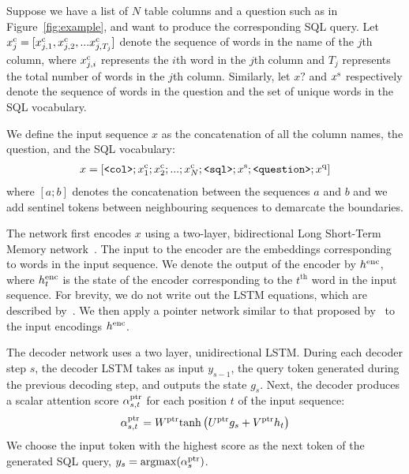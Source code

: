\documentclass{article} %
\begin{document}
Suppose we have a list of $N$ table columns and a question such as in Figure~\ref{fig:example}, and want to produce the corresponding SQL query.
Let $x_j^{\rm c} = [x^{\rm c}_{j, 1}, x^{\rm c}_{j, 2}, ... x^{\rm c}_{j, T_j}]$ denote the sequence of words in the name of the $j$th column, where $x^{\rm c}_{j, i}$ represents the $i$th word in the $j$th column and $T_j$ represents the total number of words in the $j$th column.
Similarly, let $x\question$ and $x^{\rm s}$ respectively denote the sequence of words in the question and the set of unique words in the SQL vocabulary.

We define the input sequence $x$ as the concatenation of all the column names, the question, and the SQL vocabulary:
\begin{align}
x = \left[ \texttt{<col>} ; x_1^{\rm c} ; x_2^{\rm c} ; ... ; x_{N}^{\rm c}; \texttt{<sql>}; x^{\rm s} ; \texttt{<question>}; x^{\rm q} \right]
\end{align}
where $[a ; b]$ denotes the concatenation between the sequences $a$ and $b$ and we add sentinel tokens between neighbouring sequences to demarcate the boundaries.

The network first encodes $x$ using a two-layer, bidirectional Long Short-Term Memory network~\citep{Hochreiter1997LongSM}.
The input to the encoder are the embeddings corresponding to words in the input sequence.
We denote the output of the encoder by $h^{\rm enc}$, where $h^{\rm enc}_t$ is the state of the encoder corresponding to the $t^{\text{th}}$ word in the input sequence.
For brevity, we do not write out the LSTM equations, which are described by~\citet{Hochreiter1997LongSM}.
We then apply a pointer network similar to that proposed by~\citet{vinyals-pointer_networks} to the input encodings $h^{\rm enc}$.

The decoder network uses a two layer, unidirectional LSTM.
During each decoder step $s$, the decoder LSTM takes as input $y_{s-1}$, the query token generated during the previous decoding step, and outputs the state $g_s$.
Next, the decoder produces a scalar attention score $\alpha^{\rm ptr}_{s, t}$ for each position $t$ of the input sequence:
%
\begin{align}
\label{equation:decoderattn}
\alpha^{\rm ptr}_{s, t} = W^{\rm ptr} {\rm \tanh} \left( U^{\rm ptr} g_s + V^{\rm ptr} h_t \right)
\end{align}
We choose the input token with the highest score as the next token of the generated SQL query, $y_s = {\rm argmax}(\alpha^{\rm ptr}_s)$.

\subsection{\model}
\end{document}
